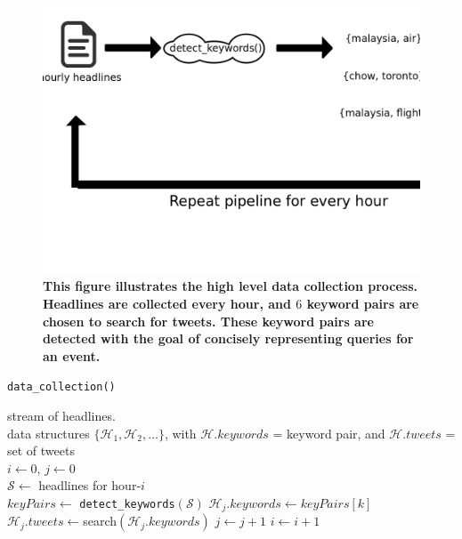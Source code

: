 \documentclass[10pt,letterpaper]{article}
\renewcommand{\H}{\mathcal{H}}
\begin{document}
\begin{figure}
  \includegraphics[width=\textwidth]{figures_SI/Pictures_and_Drawings/data_collection_1}
  \caption{\textbf{This figure illustrates the high level data
      collection process. Headlines are collected every hour, and $6$
      keyword pairs are chosen to search for tweets. These keyword
      pairs are detected with the goal of concisely representing
      queries for an event.}}
  \label{fig:data_collection_1}
\end{figure}

\begin{algorithm}
  \caption{{\tt data\_collection()}}
  \label{alg:data_collection}
  \begin{algorithmic}[1]
    \REQUIRE stream of headlines. \\
    \ENSURE data structures $\{\H_1, \H_2, \ldots \}$, with $\H.keywords$ = keyword pair, and $\H.tweets$ = set of tweets\\
    \STATE $i \leftarrow 0$, $j \leftarrow 0$ \\
    \LOOP
    \STATE $\mathcal{S} \leftarrow$ headlines for hour-$i$ \\
    \STATE $keyPairs \leftarrow$ {\tt detect\_keywords$(\mathcal{S})$}
     
    \STATE $\H_j.keywords \leftarrow keyPairs[k]$ \\
    \STATE $\H_j.tweets \leftarrow $search$(\H_j.keywords)$
     \STATE $j \leftarrow j+1$
    \ENDFOR
    \STATE $i \leftarrow i+1$
    \ENDLOOP
  \end{algorithmic}
\end{algorithm}
\end{document}
